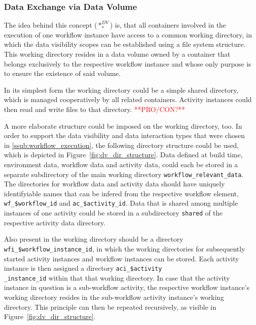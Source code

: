   \subsubsection{Data Exchange via Data Volume} %
  \label{ssub:data_exchange_via_data_volume}
    The idea behind this concept ($*_{*}^{DV}$) is, that all containers involved in the execution of one workflow instance have access to a common working directory, in which the data visibility scopes can be established using a file system structure. This working directory resides in a data volume owned by a container that belongs exclusively to the respective workflow instance and whose only purpose is to ensure the existence of said volume.


    In its simplest form the working directory could be a simple shared directory, which is managed cooperatively by all related containers. Activity instances could then read and write files to that directory.
    \textcolor{red}{**PRO/CON?**}

    A more elaborate structure could be imposed on the working directory, too. In order to support the data visibility and data interaction types that were chosen in \ref{ssub:workflow_execution}, the following directory structure could be used, which is depicted in Figure~\ref{fig:dv_dir_structure}.
    Data defined at build time, \ie environment data, workflow data and activity data, could each be stored in a separate subdirectory of the main working directory \texttt{workflow\_relevant\_data}. The directories for workflow data and activity data should have uniquely identifyiable names that can be infered from the respective workflow element, \eg \texttt{wf\_\$workflow\_id} and \texttt{ac\_\$activity\_id}. Data that is shared among multiple instances of one activity could be stored in a subdirectory \texttt{shared} of the respective activity data directory.

    Also present in the working directory should be a directory \texttt{wfi\_\$workflow\_instance\_id}, in which the working directories for subsequently started activity instances and workflow instances can be stored. Each activity instance is then assigned a directory \texttt{aci\_\$activity\\\_instance\_id} within that that working directory. In case that the activity instance in question is a sub-workflow activity, the respective workflow instance's working directory resides in the sub-workflow activity instance's working directory. This principle can then be repeated recursively, as visible in Figure~\ref{fig:dv_dir_structure}.


